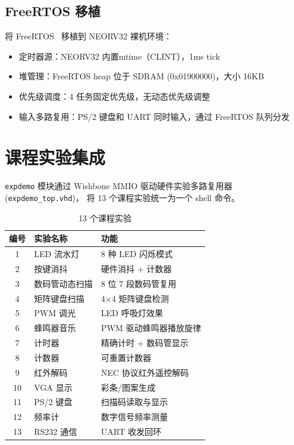 \documentclass{SYSUReport}
\begin{document}
\subsection{FreeRTOS 移植}

将 FreeRTOS~\cite{freertos} 移植到 NEORV32 裸机环境：

\begin{itemize}
    \item 定时器源：NEORV32 内置mtime（CLINT），1ms tick
    \item 堆管理：FreeRTOS heap 位于 SDRAM (0x01900000)，大小 16KB
    \item 优先级调度：4 任务固定优先级，无动态优先级调整
    \item 输入多路复用：PS/2 键盘和 UART 同时输入，通过 FreeRTOS 队列分发
\end{itemize}

\section{课程实验集成}

\texttt{expdemo} 模块通过 Wishbone MMIO 驱动硬件实验多路复用器 (\texttt{expdemo\_top.vhd})，
将 13 个课程实验统一为一个 shell 命令。

\begin{table}[!htbp]
    \centering
    \small
    \begin{tabular}{c|l|l}
        \hline
        \textbf{编号} & \textbf{实验名称} & \textbf{功能} \\
        \hline
        1  & LED 流水灯       & 8 种 LED 闪烁模式 \\
        2  & 按键消抖         & 硬件消抖 + 计数器 \\
        3  & 数码管动态扫描   & 8 位 7 段数码管复用 \\
        4  & 矩阵键盘扫描     & 4$\times$4 矩阵键盘检测 \\
        5  & PWM 调光         & LED 呼吸灯效果 \\
        6  & 蜂鸣器音乐       & PWM 驱动蜂鸣器播放旋律 \\
        7  & 计时器           & 精确计时 + 数码管显示 \\
        8  & 计数器           & 可重置计数器 \\
        9  & 红外解码         & NEC 协议红外遥控解码 \\
        10 & VGA 显示         & 彩条/图案生成 \\
        11 & PS/2 键盘        & 扫描码读取与显示 \\
        12 & 频率计           & 数字信号频率测量 \\
        13 & RS232 通信       & UART 收发回环 \\
        \hline
    \end{tabular}
    \caption{13 个课程实验}
    \label{tab:exp}
\end{table}
\end{document}
